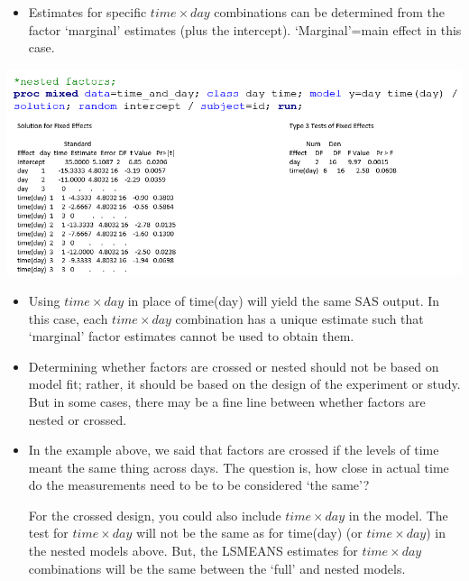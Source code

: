\documentclass[
  9pt,
  ignorenonframetext,
]{beamer}
\providecommand{\tightlist}{%
  \setlength{\itemsep}{0pt}\setlength{\parskip}{0pt}}
\begin{document}
\begin{frame}{}
\protect\hypertarget{section}{}
\begin{itemize}
\tightlist
\item
  Estimates for specific \(time \times day\) combinations can be
  determined from the factor `marginal' estimates (plus the intercept).
  `Marginal'=main effect in this case.
\end{itemize}

\begin{center}\includegraphics[width=1\linewidth]{figs_L10/f2} \end{center}

\begin{itemize}
\tightlist
\item
  Using \(time \times day\) in place of time(day) will yield the same
  SAS output. In this case, each \(time \times day\) combination has a
  unique estimate such that `marginal' factor estimates cannot be used
  to obtain them.
\end{itemize}
\end{frame}

\begin{frame}{}
\protect\hypertarget{section-1}{}
\begin{itemize}
\item
  Determining whether factors are crossed or nested should not be based
  on model fit; rather, it should be based on the design of the
  experiment or study. But in some cases, there may be a fine line
  between whether factors are nested or crossed.
\item
  In the example above, we said that factors are crossed if the levels
  of time meant the same thing across days. The question is, how close
  in actual time do the measurements need to be to be considered `the
  same'?

  For the crossed design, you could also include \(time \times day\) in
  the model. The test for \(time \times day\) will not be the same as
  for time(day) (or \(time \times day\)) in the nested models above.
  But, the LSMEANS estimates for \(time \times day\) combinations will
  be the same between the `full' and nested models.
\end{itemize}
\end{frame}
\end{document}
